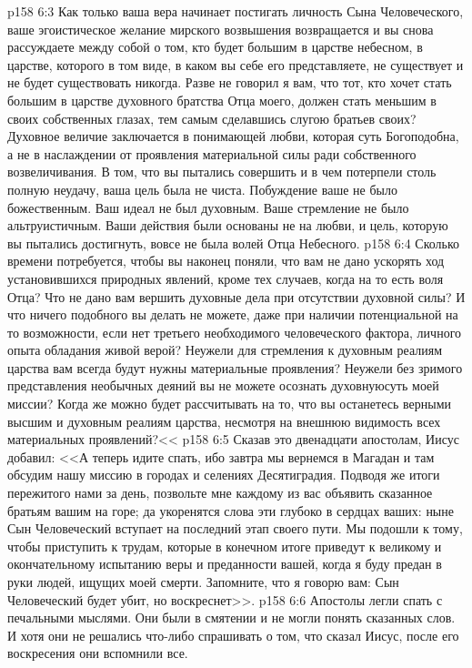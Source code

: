 \vs p158 6:3 Как только ваша вера начинает постигать личность Сына Человеческого, ваше эгоистическое желание мирского возвышения возвращается и вы снова рассуждаете между собой о том, кто будет большим в царстве небесном, в царстве, которого в том виде, в каком вы себе его представляете, не существует и не будет существовать никогда. Разве не говорил я вам, что тот, кто хочет стать большим в царстве духовного братства Отца моего, должен стать меньшим в своих собственных глазах, тем самым сделавшись слугою братьев своих? Духовное величие заключается в понимающей любви, которая суть Богоподобна, а не в наслаждении от проявления материальной силы ради собственного возвеличивания. В том, что вы пытались совершить и в чем потерпели столь полную неудачу, ваша цель была не чиста. Побуждение ваше не было божественным. Ваш идеал не был духовным. Ваше стремление не было альтруистичным. Ваши действия были основаны не на любви, и цель, которую вы пытались достигнуть, вовсе не была волей Отца Небесного.
\vs p158 6:4 Сколько времени потребуется, чтобы вы наконец поняли, что вам не дано ускорять ход установившихся природных явлений, кроме тех случаев, когда на то есть воля Отца? Что не дано вам вершить духовные дела при отсутствии духовной силы? И что ничего подобного вы делать не можете, даже при наличии потенциальной на то возможности, если нет третьего необходимого человеческого фактора, личного опыта обладания живой верой? Неужели для стремления к духовным реалиям царства вам всегда будут нужны материальные проявления? Неужели без зримого представления необычных деяний вы не можете осознать духовнуюсуть моей миссии? Когда же можно будет рассчитывать на то, что вы останетесь верными высшим и духовным реалиям царства, несмотря на внешнюю видимость всех материальных проявлений?<<
\vs p158 6:5 Сказав это двенадцати апостолам, Иисус добавил: <<А теперь идите спать, ибо завтра мы вернемся в Магадан и там обсудим нашу миссию в городах и селениях Десятиградия. Подводя же итоги пережитого нами за день, позвольте мне каждому из вас объявить сказанное братьям вашим на горе; да укоренятся слова эти глубоко в сердцах ваших: ныне Сын Человеческий вступает на последний этап своего пути. Мы подошли к тому, чтобы приступить к трудам, которые в конечном итоге приведут к великому и окончательному испытанию веры и преданности вашей, когда я буду предан в руки людей, ищущих моей смерти. Запомните, что я говорю вам: Сын Человеческий будет убит, но воскреснет>>.
\vs p158 6:6 Апостолы легли спать с печальными мыслями. Они были в смятении и не могли понять сказанных слов. И хотя они не решались что\hyp{}либо спрашивать о том, что сказал Иисус, после его воскресения они вспомнили все.
